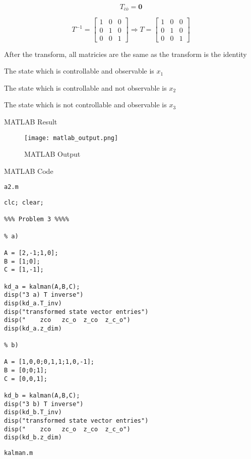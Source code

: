 \documentclass{article}
\begin{document}
\begin{enumerate}[label=\alph*)]
\[
T_{\bar c \bar o} = \mathbf{0}
\]

\[
T^{-1} = 
\begin{bmatrix}
    1 & 0 & 0 \\
    0 & 1 & 0 \\
    0 & 0 & 1
\end{bmatrix}
\Rightarrow
T = 
\begin{bmatrix}
    1 & 0 & 0 \\
    0 & 1 & 0 \\
    0 & 0 & 1
\end{bmatrix}
\]

After the transform, all  matricies are the same as the transform is the identity

The state which is controllable and observable is $x_1$

The state which is controllable and not observable is $x_2$

The state which is not controllable and observable is $x_3$

\end{enumerate}

\noindent MATLAB Result

\begin{figure}[h]
    \centering
    \texttt{[image: matlab\_output.png]}
    \caption{MATLAB Output}
    \label{fig:current_trans}
\end{figure}

\newpage

\noindent MATLAB Code

\noindent \texttt{a2.m}

\begin{verbatim}
clc; clear;

%%% Problem 3 %%%%

% a)

A = [2,-1;1,0];
B = [1;0];
C = [1,-1];

kd_a = kalman(A,B,C);
disp("3 a) T inverse")
disp(kd_a.T_inv)
disp("transformed state vector entries")
disp("    zco   zc_o  z_co  z_c_o")
disp(kd_a.z_dim)

% b)

A = [1,0,0;0,1,1;1,0,-1];
B = [0;0;1];
C = [0,0,1];

kd_b = kalman(A,B,C);
disp("3 b) T inverse")
disp(kd_b.T_inv)
disp("transformed state vector entries")
disp("    zco   zc_o  z_co  z_c_o")
disp(kd_b.z_dim)
\end{verbatim}

\noindent \texttt{kalman.m}
\end{document}

